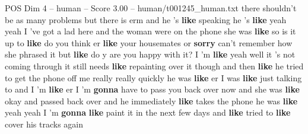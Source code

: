 \begin{textsample}{POS Dim 4 – human – Score 3.00 – human/t001245\_human.txt}  \label{ex:f4_pos_017}
there shouldn't be as many problems but there is erm and he 's \textbf{like} speaking he 's \textbf{like} yeah yeah I 've got a lad here and the woman were on the phone she was \textbf{like} so is it up to \textbf{like} do you think er \textbf{like} your housemates or \textbf{sorry} can't remember how she phrased it but \textbf{like} do y are you happy with it?
I 'm \textbf{like} yeah well it 's not coming through it still needs \textbf{like} repainting over it though and then \textbf{like} he tried to get the phone off me really really quickly he was \textbf{like} er I was \textbf{like} just talking to and I 'm \textbf{like} er I 'm \textbf{gonna} have to pass you back over now and she was \textbf{like} okay and passed back over and he immediately \textbf{like} takes the phone he was \textbf{like} yeah yeah I 'm \textbf{gonna} \textbf{like} paint it in the next few days and \textbf{like} tried to \textbf{like} cover his tracks again

\end{textsample}
